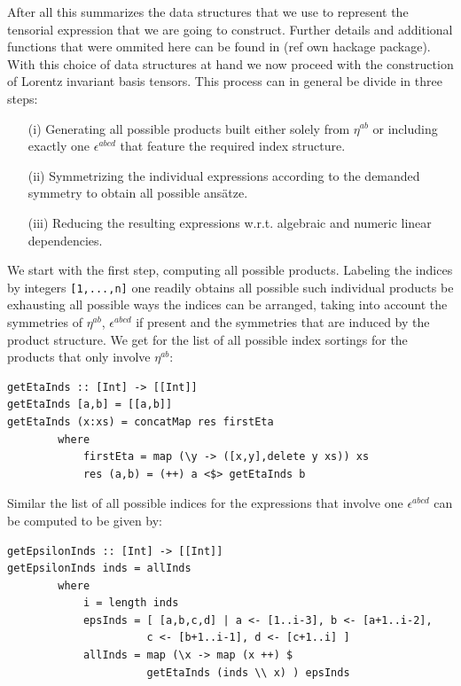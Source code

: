 \documentclass[a4paper,12pt, DIV=14, BCOR=5mm, twoside, headsepline]{scrbook}
\begin{document}
After all this summarizes the data structures that we use to represent the tensorial expression that we are going to construct. Further details and additional functions that were ommited here can be found in (ref own hackage package).  \\

With this choice of data structures at hand we now proceed with the construction of Lorentz invariant basis tensors.  
This process can in general be divide in three steps:

\begin{itemize}
    \item[(i)] Generating all possible products built either solely from $\eta^{ab}$ or including exactly one $\epsilon^{abcd}$ that feature the required index structure.
    \item[(ii)] Symmetrizing the individual expressions according to the demanded symmetry to obtain all possible ansätze.
    \item[(iii)] Reducing the resulting expressions w.r.t. algebraic and numeric linear dependencies.
\end{itemize}

We start with the first step, computing all possible products. Labeling the indices by integers \texttt{[1,...,n]} one readily obtains all possible such individual products be exhausting all possible ways the indices can be arranged, taking into account the symmetries of $\eta^{ab}$, $\epsilon^{abcd}$ if present and the symmetries that are induced by the product structure. We get for the list of all possible index sortings for the products that only involve $\eta^{ab}$:

\begin{samepage}
\begin{verbatim}
getEtaInds :: [Int] -> [[Int]]
getEtaInds [a,b] = [[a,b]]
getEtaInds (x:xs) = concatMap res firstEta
        where
            firstEta = map (\y -> ([x,y],delete y xs)) xs
            res (a,b) = (++) a <$> getEtaInds b 
\end{verbatim} 
\end{samepage}

Similar the list of all possible indices for the expressions that involve one $\epsilon^{abcd}$ can be computed to be given by:

\begin{samepage}
\begin{verbatim}
getEpsilonInds :: [Int] -> [[Int]]
getEpsilonInds inds = allInds
        where
            i = length inds 
            epsInds = [ [a,b,c,d] | a <- [1..i-3], b <- [a+1..i-2],
                      c <- [b+1..i-1], d <- [c+1..i] ] 
            allInds = map (\x -> map (x ++) $
                      getEtaInds (inds \\ x) ) epsInds 
\end{verbatim} 
\end{samepage}
\end{document}
